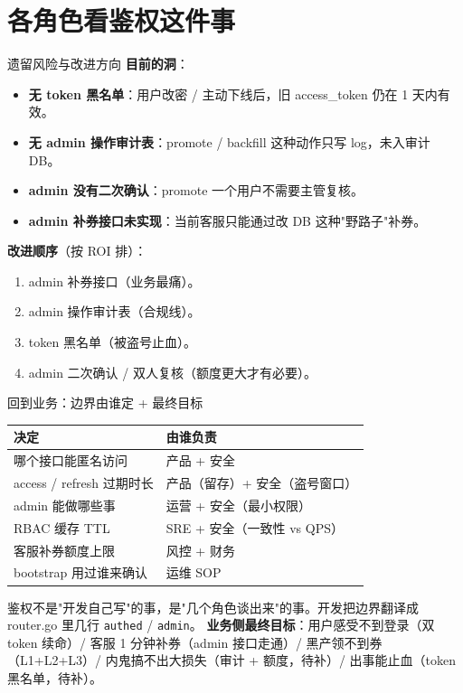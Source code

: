 \section{各角色看鉴权这件事}

\begin{frame}{遗留风险与改进方向}
\textbf{目前的洞}：
\begin{itemize}
  \item \textbf{无 token 黑名单}：用户改密 / 主动下线后，旧 access\_token 仍在 1 天内有效。
  \item \textbf{无 admin 操作审计表}：promote / backfill 这种动作只写 log，未入审计 DB。
  \item \textbf{admin 没有二次确认}：promote 一个用户不需要主管复核。
  \item \textbf{admin 补券接口未实现}：当前客服只能通过改 DB 这种"野路子"补券。
\end{itemize}
\vspace{2mm}
\textbf{改进顺序}（按 ROI 排）：
\begin{enumerate}
  \item admin 补券接口（业务最痛）。
  \item admin 操作审计表（合规线）。
  \item token 黑名单（被盗号止血）。
  \item admin 二次确认 / 双人复核（额度更大才有必要）。
\end{enumerate}
\end{frame}

\begin{frame}{回到业务：边界由谁定 + 最终目标}
\begin{tabular}{@{}ll@{}}
\toprule
决定 & 由谁负责 \\
\midrule
哪个接口能匿名访问           & 产品 + 安全 \\
access / refresh 过期时长   & 产品（留存）+ 安全（盗号窗口）\\
admin 能做哪些事             & 运营 + 安全（最小权限）\\
RBAC 缓存 TTL                & SRE + 安全（一致性 vs QPS）\\
客服补券额度上限             & 风控 + 财务 \\
bootstrap 用过谁来确认       & 运维 SOP \\
\bottomrule
\end{tabular}
\vspace{2mm}
\small 鉴权不是"开发自己写"的事，是"几个角色谈出来"的事。开发把边界翻译成 router.go 里几行 \texttt{authed} / \texttt{admin}。
\vspace{2mm}
\textbf{业务侧最终目标}：用户感受不到登录（双 token 续命）/ 客服 1 分钟补券（admin 接口走通）/ 黑产领不到券（L1+L2+L3）/ 内鬼搞不出大损失（审计 + 额度，待补）/ 出事能止血（token 黑名单，待补）。
\end{frame}


